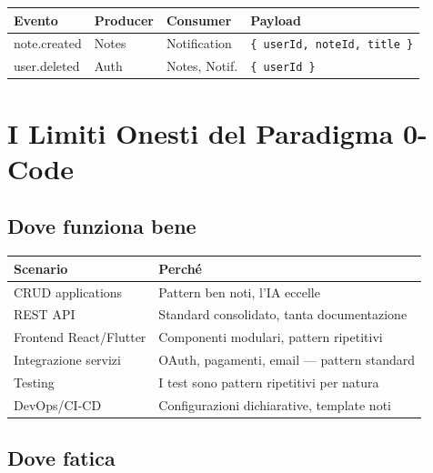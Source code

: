 \begin{center}
\begin{tabularx}{\textwidth}{l l l X}
\toprule
\textbf{Evento} & \textbf{Producer} & \textbf{Consumer} & \textbf{Payload} \\
\midrule
note.created & Notes & Notification & \texttt{\{ userId, noteId, title \}} \\
user.deleted & Auth & Notes, Notif. & \texttt{\{ userId \}} \\
\bottomrule
\end{tabularx}
\end{center}

\section{I Limiti Onesti del Paradigma 0-Code}

\subsection{Dove funziona bene}

\begin{center}
\begin{tabularx}{\textwidth}{l X}
\toprule
\textbf{Scenario} & \textbf{Perché} \\
\midrule
CRUD applications & Pattern ben noti, l'IA eccelle \\
REST API & Standard consolidato, tanta documentazione \\
Frontend React/Flutter & Componenti modulari, pattern ripetitivi \\
Integrazione servizi & OAuth, pagamenti, email --- pattern standard \\
Testing & I test sono pattern ripetitivi per natura \\
DevOps/CI-CD & Configurazioni dichiarative, template noti \\
\bottomrule
\end{tabularx}
\end{center}

\subsection{Dove fatica}

